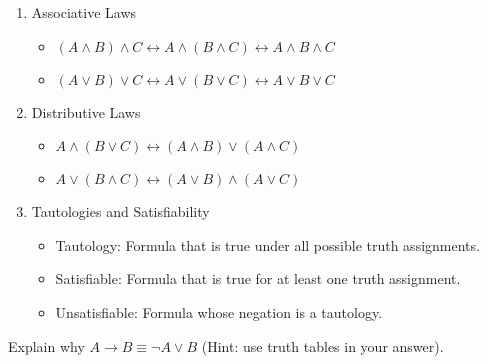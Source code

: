 \documentclass[solution, letterpaper]{cs20inclass}
\begin{document}
\begin{enumerate}
\item Associative Laws
  \begin{itemize}
    \item $(A \land B) \land C \longleftrightarrow A \land (B \land C) \longleftrightarrow A \land B \land C$
    \item $(A \lor B) \lor C \longleftrightarrow A \lor (B \lor C) \longleftrightarrow A \lor B \lor C$
  \end{itemize}

\item Distributive Laws
  \begin{itemize}
    \item $A \land (B \lor C) \longleftrightarrow (A \land B) \lor (A \land C)$
     \item $A \lor (B \land C) \longleftrightarrow (A \lor B) \land (A \lor C)$
  \end{itemize}

\item Tautologies and Satisfiability
  \begin{itemize}
    \item Tautology:  Formula that is true under all possible truth assignments.
    \item Satisfiable:  Formula that is true for at least one truth assignment.
    \item Unsatisfiable:  Formula whose negation is a tautology.
  \end{itemize}

\end{enumerate}
\pagebreak

\problem

Explain why $A \rightarrow B \equiv \lnot A \lor B$ (Hint: use truth tables in your answer).
\end{document}
